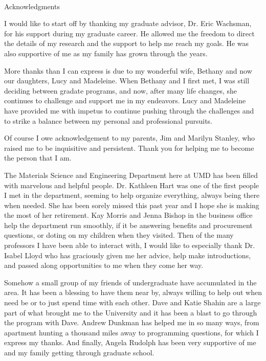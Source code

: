 

\renewcommand{\baselinestretch}{2}
\small\normalsize
\hbox{\ }

\vspace{-.65in}

\begin{center}
\large{Acknowledgments}
\end{center}

\vspace{1ex}

I would like to start off by thanking my graduate advisor, Dr. Eric Wachsman, for his support during my graduate career.
He allowed me the freedom to direct the details of my research and the support to help me reach my goals.
He was also supportive of me as my family has grown through the years.

More thanks than I can express is due to my wonderful wife, Bethany and now our daughters, Lucy and Madeleine.
When Bethany and I first met, I was still deciding between gradate programs, and now, after many life changes, she continues to challenge and support me in my endeavors.
Lucy and Madeleine have provided me with impetus to continue pushing through the challenges and to strike a balance between my personal and professional pursuits.

Of course I owe acknowledgement to my parents, Jim and Marilyn Stanley, who raised me to be inquisitive and persistent.
Thank you for helping me to become the person that I am.

The Materials Science and Engineering Department here at UMD has been filled with marvelous and helpful people.
Dr. Kathleen Hart was one of the first people I met in the department, seeming to help organize everything, always being there when needed.
She has been sorely missed this past year and I hope she is making the most of her retirement.
Kay Morris and Jenna Bishop in the business office help the department run smoothly, if it be answering benefits and procurement questions, or doting on my children when they visited.
Then of the many professors I have been able to interact with, I would like to especially thank Dr. Isabel Lloyd who has graciously given me her advice, help make introductions, and passed along opportunities to me when they come her way.

Somehow a small group of my friends of undergraduate have accumulated in the area.
It has been a blessing to have them near by, always willing to help out when need be or to just spend time with each other.
Dave and Katie Shahin are a large part of what brought me to the University and it has been a blast to go through the program with Dave.
Andrew Dunkman has helped me in so many ways, from apartment hunting a thousand miles away to programming questions, for which I express my thanks.
And finally, Angela Rudolph has been very supportive of me and my family getting through graduate school.

